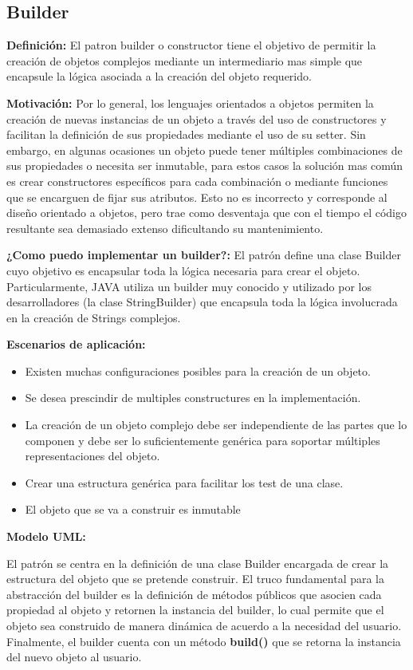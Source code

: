\subsection{Builder}

\textbf{Definición:} El patron builder o constructor tiene el objetivo de permitir la creación de objetos complejos mediante un intermediario mas simple que encapsule la lógica asociada a la creación del objeto requerido.

\textbf{Motivación:} Por lo general, los lenguajes orientados a objetos permiten la creación de nuevas instancias de un objeto a través del uso de constructores y facilitan la definición de sus propiedades mediante el uso de su setter. Sin embargo, en algunas ocasiones un objeto puede tener múltiples combinaciones de sus propiedades o necesita ser inmutable, para estos casos la solución mas común es crear constructores específicos para cada combinación o mediante funciones que se encarguen de fijar sus atributos. Esto no es incorrecto y corresponde al diseño orientado a objetos, pero trae como desventaja que con el tiempo el código resultante sea demasiado extenso dificultando su mantenimiento.

\textbf{¿Como puedo implementar un builder?:} El patrón define una clase Builder cuyo objetivo es encapsular toda la lógica necesaria para crear el objeto. Particularmente, JAVA utiliza un builder muy conocido y utilizado por los desarrolladores (la clase StringBuilder) que encapsula toda la lógica involucrada en la creación de Strings complejos.

\textbf{Escenarios de aplicación:}

\begin{itemize}
	\item Existen muchas configuraciones posibles para la creación de un objeto.
	\item Se desea prescindir de multiples constructures en la implementación.
	\item La creación de un objeto complejo debe ser independiente de las partes que lo componen y debe ser lo suficientemente genérica para soportar múltiples representaciones del objeto.
	\item Crear una estructura genérica para facilitar los test de una clase.
	\item El objeto que se va a construir es inmutable
\end{itemize}

\textbf{Modelo UML:}

El patrón se centra en la definición de una clase Builder encargada de crear la estructura del objeto que se pretende construir. El truco fundamental para la abstracción del builder es la definición de métodos públicos que asocien cada propiedad al objeto y retornen la instancia del builder, lo cual permite que el objeto sea construido de manera dinámica de acuerdo a la necesidad del usuario. Finalmente, el builder cuenta con un método \textbf{build()} que se retorna la instancia del nuevo objeto al usuario.

